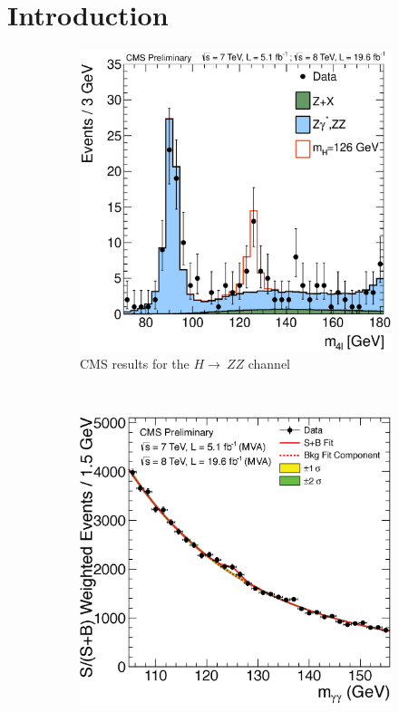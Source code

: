 \chapter{Introduction}
\label{introduction}

\begin{figure}
    \centering
    \begin{subfigure}[b]{0.3\textwidth}
        \label{fig:qft_lo_ee_scattering}
        \includegraphics[width=\textwidth]{Figures/Experimental_Results/CmsHZZ4lMass.eps}
        \caption{CMS results for the $H\rightarrow~ZZ$ channel}
      \end{subfigure}
      ~ %
      \begin{subfigure}[b]{0.3\textwidth}
          \label{fig:qft_nlo_ee_scattering}
          \includegraphics[width=\textwidth]{Figures/Experimental_Results/CmsHggMassMVAMoriond13.eps}

\end{subfigure}
\end{figure}
